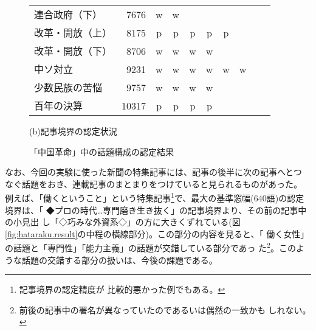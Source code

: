 \begin{figure}[htbp]
\begin{center}
\begin{tabular}{l|r|cccccccc}
      連合政府（下）            & 7676 & w & w &   &   &   &   &   &   \\
      改革・開放（上）          & 8175 & p & p & p & p & p &   &   &   \\
      改革・開放（下）          & 8706 & w & w & w & w &   &   &   &   \\
      中ソ対立                  & 9231 & w & w & w & w & w & w &   &   \\
      少数民族の苦悩            & 9757 & w & w & w & w &   &   &   &   \\
      百年の決算                &10317 & p & p & p & p &   &   &   &   \\
    \end{tabular}
  \end{center}
  \begin{center}
    {(b)記事境界の認定状況}\\
  \end{center}
  \caption{「中国革命」中の話題構成の認定結果}
  \label{fig:china.result}
\end{figure}

なお、今回の実験に使った新聞の特集記事には、記事の後半に次の記事へとつ
なぐ話題をおき、連載記事のまとまりをつけていると見られるものがあった。
例えば、「働くということ」という特集記事\footnote{記事境界の認定精度が
  比較的悪かった例でもある。}で、最大の基準窓幅(640語)の認定境界は、「
◆プロの時代…専門磨き生き抜く」の記事境界より、その前の記事中の小見出
し「◇巧みな外資系◇」の方に大きくずれている(図
\ref{fig:hataraku.result}の中程の横線部分)。この部分の内容を見ると、「
働く女性」の話題と「専門性」「能力主義」の話題が交錯している部分であっ
た\footnote{前後の記事中の署名が異なっていたのであるいは偶然の一致かも
  しれない。}。このような話題の交錯する部分の扱いは、今後の課題である。

